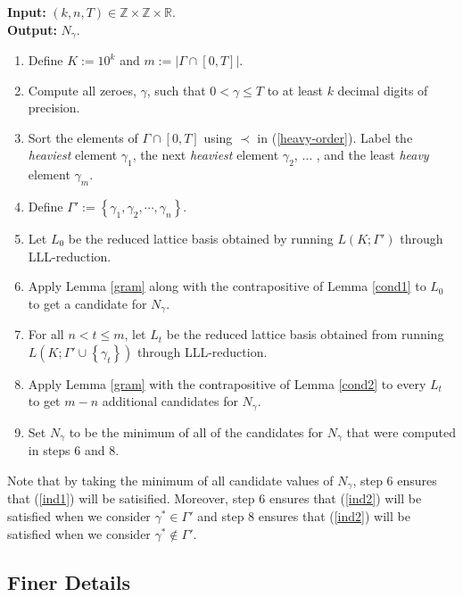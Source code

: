 \documentclass{article}
\numberwithin{equation}{section}
\begin{document}
\begin{algorithm}[H]\label{main-algo}
\textbf{Input:} $(k,n,T) \in \mathbb{Z} \times \mathbb{Z} \times \mathbb{R}$.\\
\textbf{Output:} $N_\gamma$.
\begin{enumerate}
 \item Define $K := 10^k$ and $m := \left|\Gamma \cap [0,T]\right|$.
 \item Compute all zeroes, $\gamma$, such that $0 <\gamma \leq T$ to at least $k$ decimal digits of precision.
 \item Sort the elements of $\Gamma \cap [0,T]$ using $\prec$ in (\ref{heavy-order}). Label the {\it heaviest} element $\gamma_1$, the next {\it heaviest} element $\gamma_2$, $\ldots$ , and the least {\it heavy} element $\gamma_m$.
 \item Define $\Gamma' := \left\{\gamma_1,\gamma_2, \cdots , \gamma_n\right\}$.
 \item Let $L_0$ be the reduced lattice basis obtained by running $L(K;\Gamma')$ through LLL-reduction.
 \item Apply Lemma \ref{gram} along with the contrapositive of Lemma \ref{cond1} to $L_0$ to get a candidate for $N_\gamma$.
 \item For all $n < t \leq m$, let $L_t$ be the reduced lattice basis obtained from running $L\left(K;\Gamma' \cup \left\{\gamma_t\right\}\right)$ through LLL-reduction.
 \item Apply Lemma \ref{gram} with the contrapositive of Lemma \ref{cond2} to every $L_t$ to get $m-n$ additional candidates for $N_\gamma$.
 \item Set $N_\gamma$ to be the minimum of all of the candidates for $N_\gamma$ that were computed in steps 6 and 8.
\end{enumerate}
\caption{Returns an appropriate value for $N_\gamma$ that satisfies the conditions laid out in (\ref{ind1}) and (\ref{ind2}).}
\end{algorithm}
%
Note that by taking the minimum of all candidate values of $N_\gamma$, step 6 ensures that (\ref{ind1}) will be satisified. Moreover, step 6 ensures that (\ref{ind2}) will be satisfied when we consider $\gamma^* \in \Gamma'$ and step 8 ensures that (\ref{ind2}) will be satisfied when we consider $\gamma^* \not\in \Gamma'$.

\subsection{Finer Details}
\end{document}
